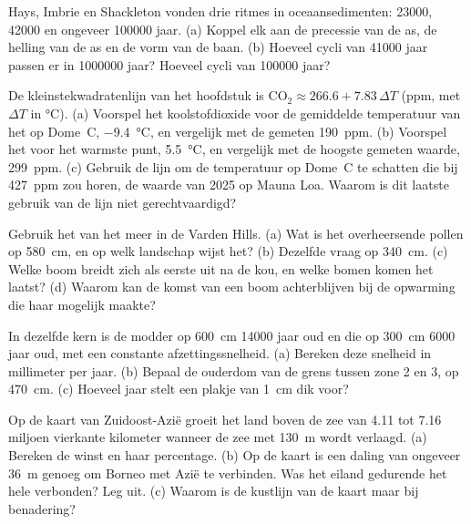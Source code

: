 \begin{exercise}[$\star$]\label{exo:g12:past-climates:5}
Hays, Imbrie en Shackleton vonden drie ritmes in oceaansedimenten:
\num{23000}, \num{42000} en ongeveer \num{100000} jaar. (a) Koppel elk aan de
precessie van de as, de helling van de as en de vorm van de baan.
(b) Hoeveel cycli van \num{41000} jaar passen er in \num{1000000} jaar? Hoeveel
cycli van \num{100000} jaar?
\end{exercise}

\begin{exercise}[$\star\star$]\label{exo:g12:past-climates:6}
De kleinstekwadratenlijn van het hoofdstuk is $\mathrm{CO_2} \approx 266.6 +
7.83\,\Delta T$ (ppm, met $\Delta T$ in \unit{\degreeCelsius}).
(a) Voorspel het koolstofdioxide voor de gemiddelde temperatuur van het  op Dome~C, \qty{-9.4}{\degreeCelsius}, en vergelijk met de gemeten
\qty{190}{ppm}. (b) Voorspel het voor het warmste punt, \qty{+5.5}{\degreeCelsius},
en vergelijk met de hoogste gemeten waarde, \qty{299}{ppm}. (c) Gebruik de lijn
om de temperatuur op Dome~C te schatten die bij \qty{427}{ppm} zou horen, de
waarde van 2025 op Mauna Loa. Waarom is dit laatste gebruik van de lijn niet gerechtvaardigd?
\end{exercise}

\begin{exercise}[$\star\star$]\label{exo:g12:past-climates:7}
Gebruik het  van het meer in de Varden Hills. (a) Wat is het overheersende
pollen op \qty{580}{cm}, en op welk landschap wijst het? (b) Dezelfde
vraag op \qty{340}{cm}. (c) Welke boom breidt zich als eerste uit na de kou, en
welke bomen komen het laatst? (d) Waarom kan de komst van een boom achterblijven bij de
opwarming die haar mogelijk maakte?
\end{exercise}

\begin{exercise}[$\star\star$]\label{exo:g12:past-climates:8}
In dezelfde kern is de modder op \qty{600}{cm} \num{14000} jaar oud en die
op \qty{300}{cm} \num{6000} jaar oud, met een constante afzettingssnelheid.
(a) Bereken deze snelheid in millimeter per jaar. (b) Bepaal de ouderdom van de grens
tussen zone 2 en 3, op \qty{470}{cm}. (c) Hoeveel jaar stelt een plakje van
\qty{1}{cm} dik voor?
\end{exercise}

\begin{exercise}[$\star\star$]\label{exo:g12:past-climates:9}
Op de kaart van Zuidoost-Azië groeit het land boven de zee van 4.11 tot
7.16 miljoen vierkante kilometer wanneer de zee met \qty{130}{m} wordt verlaagd.
(a) Bereken de winst en haar percentage. (b) Op de kaart is een daling van ongeveer
\qty{36}{m} genoeg om Borneo met Azië te verbinden. Was het eiland gedurende het hele  verbonden? Leg uit. (c) Waarom is de kustlijn van de kaart maar bij
benadering?
\end{exercise}

